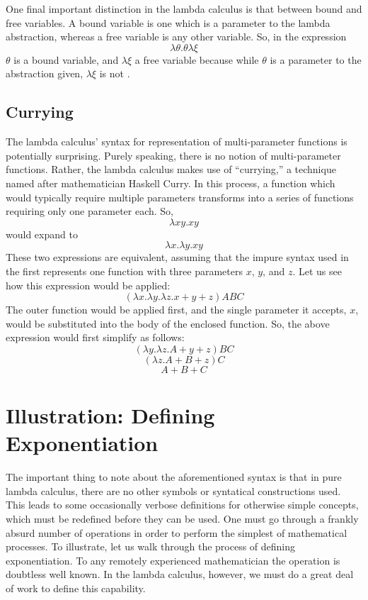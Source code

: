 \documentclass[twocolumn,titlepage,12pt]{article}
\begin{document}
One final important distinction in the lambda calculus is that between bound and free variables. A bound variable is one which is a parameter to the lambda abstraction, whereas a free variable is any other variable. So, in the expression
$$\lambda \theta.\theta \lambda \xi$$
$\theta$ is a bound variable, and $\lambda \xi$ a free variable because while $\theta$ is a parameter to the abstraction given, $\lambda \xi$ is not \cite{stanfordlc}.

\subsection{Currying}
The lambda calculus' syntax for representation of multi-parameter functions is potentially surprising. Purely speaking, there is no notion of multi-parameter functions. Rather, the lambda calculus makes use of ``currying,'' a technique named after mathematician Haskell Curry. In this process, a function which would typically require multiple parameters transforms into a series of functions requiring only one parameter each. So,
$$\lambda xy.xy$$
would expand to
$$\lambda x.\lambda y.xy$$
These two expressions are equivalent, assuming that the impure syntax used in the first represents one function with three parameters $x$, $y$, and $z$. Let us see how this expression would be applied:
$$(\lambda x.\lambda y.\lambda z.x+y+z)ABC$$
The outer function would be applied first, and the single parameter it accepts, $x$, would be substituted into the body of the enclosed function. So, the above expression would first simplify as follows:
$$(\lambda y.\lambda z.A+y+z)BC$$
$$(\lambda z.A+B+z)C$$
$$A+B+C$$

\section{Illustration: Defining Exponentiation}
The important thing to note about the aforementioned syntax is that in pure lambda calculus, there are no other symbols or syntatical constructions used. This leads to some occasionally verbose definitions for otherwise simple concepts, which must be redefined before they can be used. One must go through a frankly absurd number of operations in order to perform the simplest of mathematical processes. To illustrate, let us walk through the process of defining exponentiation. To any remotely experienced mathematician the operation is doubtless well known. In the lambda calculus, however, we must do a great deal of work to define this capability.
\end{document}
